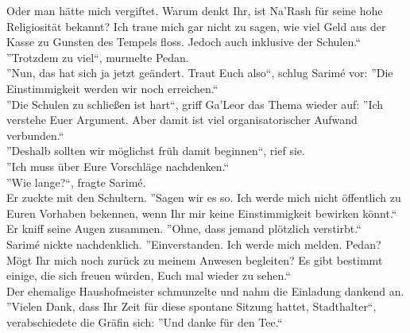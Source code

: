 Oder man hätte mich vergiftet. Warum denkt Ihr, ist Na'Rash für seine hohe Religiosität 
bekannt? Ich traue mich gar nicht zu sagen, wie viel Geld aus der Kasse zu Gunsten des Tempels 
floss. Jedoch auch inklusive der Schulen.``\\
''Trotzdem zu viel``, murmelte Pedan.\\
''Nun, das hat sich ja jetzt geändert. Traut Euch also``, schlug Sarimé vor: ''Die Einstimmigkeit 
werden wir noch erreichen.``\\
''Die Schulen zu schließen ist hart``, griff Ga'Leor das Thema wieder auf: ''Ich verstehe Euer 
Argument. Aber damit ist viel organisatorischer Aufwand verbunden.``\\
''Deshalb sollten wir möglichst früh damit beginnen``, rief sie.\\
''Ich muss über Eure Vorschläge nachdenken.``\\
''Wie lange?``, fragte Sarimé.\\
Er zuckte mit den Schultern. ''Sagen wir es so. Ich werde mich nicht öffentlich zu Euren Vorhaben 
bekennen, wenn Ihr mir keine Einstimmigkeit bewirken könnt.`` Er kniff seine Augen zusammen. 
''Ohne, dass jemand plötzlich verstirbt.``\\
Sarimé nickte nachdenklich. ''Einverstanden. Ich werde mich melden. Pedan? Mögt Ihr mich noch 
zurück zu meinem Anwesen begleiten? Es gibt bestimmt einige, die sich freuen würden, Euch mal 
wieder zu sehen.``\\
Der ehemalige Haushofmeister schmunzelte und nahm die Einladung dankend an.\\
''Vielen Dank, dass Ihr Zeit für diese spontane Sitzung hattet, Stadthalter``, verabschiedete die 
Gräfin sich: ''Und danke für den Tee.``\\

